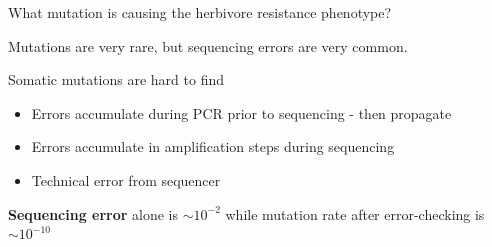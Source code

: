 \documentclass{beamer}
\begin{document}
\begin{frame}{What mutation is causing the herbivore resistance phenotype?}
\begin{center}
\end{center}
\end{frame}




\begin{frame}{Mutations are very rare, but sequencing errors are very common.}

Somatic mutations are hard to find

\begin{itemize}
\item Errors accumulate during PCR prior to sequencing - then propagate
\item Errors accumulate in amplification steps during sequencing
\item Technical error from sequencer
\end{itemize}

\textbf{Sequencing error} alone is \textbf{$\sim10^{-2}$} while mutation rate after error-checking is \textbf{$\sim10^{-10}$}

\end{frame}
\end{document}
